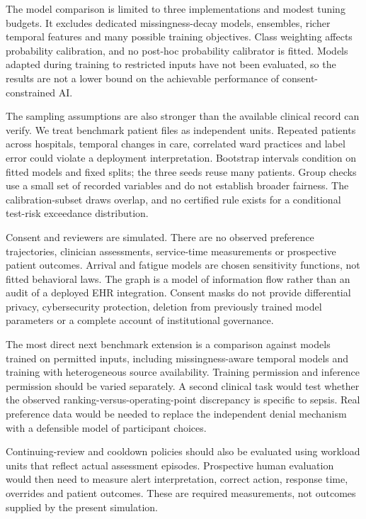 The model comparison is limited to three implementations and modest tuning budgets. It excludes dedicated missingness-decay models, ensembles, richer temporal features and many possible training objectives. Class weighting affects probability calibration, and no post-hoc probability calibrator is fitted. Models adapted during training to restricted inputs have not been evaluated, so the results are not a lower bound on the achievable performance of consent-constrained AI.

The sampling assumptions are also stronger than the available clinical record can verify. We treat benchmark patient files as independent units. Repeated patients across hospitals, temporal changes in care, correlated ward practices and label error could violate a deployment interpretation. Bootstrap intervals condition on fitted models and fixed splits; the three seeds reuse many patients. Group checks use a small set of recorded variables and do not establish broader fairness. The calibration-subset draws overlap, and no certified rule exists for a conditional test-risk exceedance distribution.

Consent and reviewers are simulated. There are no observed preference trajectories, clinician assessments, service-time measurements or prospective patient outcomes. Arrival and fatigue models are chosen sensitivity functions, not fitted behavioral laws. The graph is a model of information flow rather than an audit of a deployed EHR integration. Consent masks do not provide differential privacy, cybersecurity protection, deletion from previously trained model parameters or a complete account of institutional governance.

The most direct next benchmark extension is a comparison against models trained on permitted inputs, including missingness-aware temporal models and training with heterogeneous source availability. Training permission and inference permission should be varied separately. A second clinical task would test whether the observed ranking-versus-operating-point discrepancy is specific to sepsis. Real preference data would be needed to replace the independent denial mechanism with a defensible model of participant choices.

Continuing-review and cooldown policies should also be evaluated using workload units that reflect actual assessment episodes. Prospective human evaluation would then need to measure alert interpretation, correct action, response time, overrides and patient outcomes. These are required measurements, not outcomes supplied by the present simulation.


